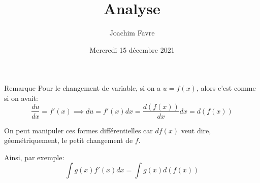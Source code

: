 \documentclass[a4paper]{article}
\title{Analyse}
\author{Joachim Favre}
\date{Mercredi 15 décembre 2021}
\begin{document}
\maketitle


\begin{parag}{Remarque}
    Pour le changement de variable, si on a $u = f\left(x\right)$, alors c'est comme si on avait:
    \[\frac{du}{dx} = f'\left(x\right) \implies du = f'\left(x\right)dx = \frac{d\left(f\left(x\right)\right)}{dx} dx = d\left(f\left(x\right)\right)\]

    On peut manipuler ces formes différentielles car $df\left(x\right)$ veut dire, géométriquement, le petit changement de $f$.

    Ainsi, par exemple: 
    \[\int g\left(x\right) f'\left(x\right) dx = \int g\left(x\right) d\left(f\left(x\right)\right)\]
\end{parag}
\end{document}
